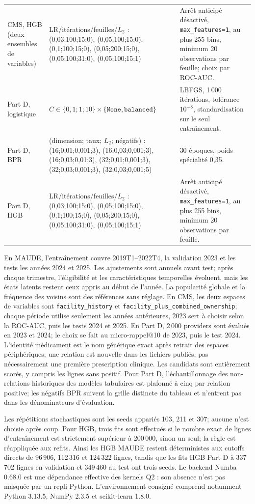 \begin{longtable}{@{}p{26mm}p{68mm}p{48mm}@{}}
CMS, HGB (deux ensembles de variables) & LR/itérations/feuilles/$L_2$ : (0{,}03;100;15;0), (0{,}05;100;15;0), (0{,}1;100;15;0), (0{,}05;200;15;0), (0{,}05;100;31;0), (0{,}05;100;15;1) & Arrêt anticipé désactivé, \texttt{max\_features=1}, au plus 255 bins, minimum 20 observations par feuille; choix par ROC-AUC.\\
Part D, logistique & $C\in\{0{,}1;1;10\}\times\{\texttt{None},\texttt{balanced}\}$ & LBFGS, 1\,000 itérations, tolérance $10^{-8}$, standardisation sur le seul entraînement.\\
Part D, BPR & (dimension; taux; $L_2$; négatifs) : (16;0{,}01;0{,}001;3), (16;0{,}03;0{,}001;3), (16;0{,}03;0{,}01;3), (32;0{,}01;0{,}001;3), (32;0{,}03;0{,}001;3), (32;0{,}03;0{,}001;5) & 30 époques, poids spécialité 0{,}35.\\
Part D, HGB & LR/itérations/feuilles/$L_2$ : (0{,}03;100;15;0), (0{,}05;100;15;0), (0{,}1;100;15;0), (0{,}05;200;15;0), (0{,}05;100;31;0), (0{,}05;100;15;1) & Arrêt anticipé désactivé, \texttt{max\_features=1}, au plus 255 bins, minimum 20 observations par feuille.\\
\bottomrule
\end{longtable}

En MAUDE, l'entraînement couvre 2019T1--2022T4, la validation 2023 et les tests les années 2024 et 2025. Les ajustements sont annuels avant test; après chaque trimestre, l'éligibilité et les caractéristiques temporelles évoluent, mais les états latents restent ceux appris au début de l'année. La popularité globale et la fréquence des voisins sont des références sans réglage. En CMS, les deux espaces de variables sont \texttt{facility\_history} et \texttt{facility\_plus\_combined\_ownership}; chaque période utilise seulement les années antérieures, 2023 sert à choisir selon la ROC-AUC, puis les tests 2024 et 2025. En Part D, 2\,000 providers sont évalués en 2023 et 2024; le choix se fait au micro-rappel@10 de 2023, puis le test 2024. L'identité médicament est le nom générique exact après retrait des espaces périphériques; une relation est nouvelle dans les fichiers publiés, pas nécessairement une première prescription clinique. Les candidats sont entièrement scorés, y compris les lignes sans positif.
Pour Part D, l'échantillonnage des non-relations historiques des modèles tabulaires est plafonné à cinq par relation positive; les négatifs BPR suivent la grille distincte du tableau et n'entrent pas dans les dénominateurs d'évaluation.

Les répétitions stochastiques sont les seeds appariés 103, 211 et 307; aucune n'est choisie après coup. Pour HGB, trois fits sont effectués si le nombre exact de lignes d'entraînement est strictement supérieur à 200\,000, sinon un seul; la règle est réappliquée aux refits. Ainsi les HGB MAUDE restent déterministes aux cutoffs directs de 96\,906, 112\,316 et 124\,322 lignes, tandis que les fits HGB Part D à 337\,702 lignes en validation et 349\,460 au test ont trois seeds. Le backend Numba 0.68.0 est une dépendance effective des kernels Q2 : son absence n'est pas masquée par un repli Python. L'environnement consigné comprend notamment Python 3.13.5, NumPy 2.3.5 et scikit-learn 1.8.0.

